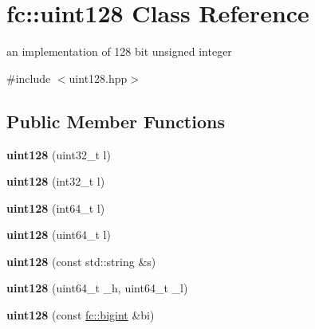 \hypertarget{classfc_1_1uint128}{}\section{fc\+:\+:uint128 Class Reference}
\label{classfc_1_1uint128}


an implementation of 128 bit unsigned integer  




{\ttfamily \#include $<$uint128.\+hpp$>$}

\subsection*{Public Member Functions}
\begin{DoxyCompactItemize}
\item 
\mbox{\label{classfc_1_1uint128_aba34953607ca94d53cd2a8f0547e7de5}} 
{\bfseries uint128} (uint32\+\_\+t l)
\item 
\mbox{\label{classfc_1_1uint128_a45eb105a6561b07042dbc1506a5e8c3f}} 
{\bfseries uint128} (int32\+\_\+t l)
\item 
\mbox{\label{classfc_1_1uint128_a81444a519ec1b4622a8445153b389c8c}} 
{\bfseries uint128} (int64\+\_\+t l)
\item 
\mbox{\label{classfc_1_1uint128_a33f9c3e0acb62f79e7aba1880adfbfcf}} 
{\bfseries uint128} (uint64\+\_\+t l)
\item 
\mbox{\label{classfc_1_1uint128_abb989d93c261f6ae9511f975d0aafa45}} 
{\bfseries uint128} (const std\+::string \&s)
\item 
\mbox{\label{classfc_1_1uint128_a1d52faeab1491c4d793aa82e989789c9}} 
{\bfseries uint128} (uint64\+\_\+t \+\_\+h, uint64\+\_\+t \+\_\+l)
\item 
\mbox{\label{classfc_1_1uint128_af5297e0cfb6235d9dd727fc7dd4bb1e3}} 
{\bfseries uint128} (const \mbox{\hyperlink{classfc_1_1bigint}{fc\+::bigint}} \&bi)
\item 
\mbox{\label{classfc_1_1uint128_a7c9c1806db135c08470fb07071ab7306}} 

\end{DoxyCompactItemize}
